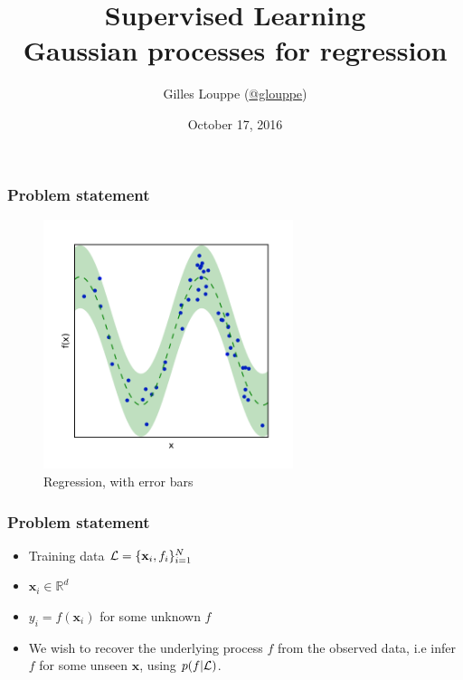 \documentclass{beamer}
\title{{\bf Supervised Learning}\\
Gaussian processes for regression}
\author{
Gilles Louppe (\href{https://twitter.com/glouppe}{@glouppe})
}
\date{October 17, 2016}
\begin{document}
\begin{frame}[plain]
\titlepage
\end{frame}


\begin{frame}
    \frametitle{Problem statement}

    \begin{figure}
    \centering
    \includegraphics[width=0.65\textwidth]{./figures/regression-bars.pdf}\\
    Regression, with error bars
    \end{figure}
\end{frame}


\begin{frame}
    \frametitle{Problem statement}

    \begin{itemize}
        \item Training data ${\cal L} = \{\mathbf{x}_i, f_i\}_{i=1}^N$
        \item $\mathbf{x}_i \in \mathbb{R}^d$
        \item $y_i = f(\mathbf{x}_i)$ for some unknown $f$
        \item We wish to recover the underlying process $f$ from the observed data, i.e infer $f$ for some unseen $\mathbf{x}$, using $p(f|{\cal L})$.
    \end{itemize}
\end{frame}
\end{document}
